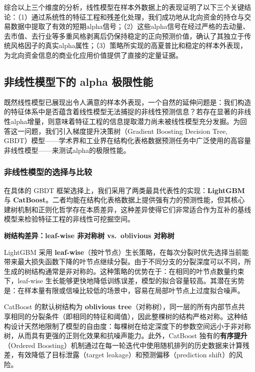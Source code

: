 \documentclass{article}
\begin{document}
综合以上三个维度的分析，线性模型在样本外数据上的表现证明了以下三个关键结论：（1）通过系统性的特征工程和残差化处理，我们成功地从北向资金的持仓与交易数据中提取了有效的短期alpha信号；（2）这些alpha信号在经过严格的去动量、去市值、去行业等多重风格剥离后仍保持稳定的正向预测价值，确认了其独立于传统风格因子的真实alpha属性；（3）策略所实现的高夏普比和稳定的样本外表现，为北向资金信息的商业化应用价值提供了直接的定量证据。

\subsection{非线性模型下的 alpha 极限性能}
\label{sec:nonlinear}

既然线性模型已展现出令人满意的样本外表现，一个自然的延伸问题是：我们构造的特征体系中是否蕴含着线性模型无法捕捉的非线性预测信息？若存在显著的非线性alpha增量，则意味着特征工程的信息提取潜力尚未被线性模型充分发掘。为回答这一问题，我们引入梯度提升决策树（Gradient Boosting Decision Tree, GBDT）模型——学术界和工业界在结构化表格数据预测任务中广泛使用的高容量非线性模型——来测试alpha的极限性能。

\subsubsection{非线性模型的选择与比较}

在具体的 GBDT 框架选择上，我们采用了两类最具代表性的实现：\textbf{LightGBM} 与 \textbf{CatBoost}。二者均能在结构化表格数据上提供强有力的预测性能，但其核心建树机制和正则化哲学存在本质差异，这种差异使得它们非常适合作为互补的基线模型来检验特征工程的非线性可挖掘空间。

\vspace{0.3em}
\noindent\textbf{树结构差异：leaf-wise 非对称树 vs.\ oblivious 对称树}

LightGBM 采用 \textbf{leaf-wise}（按叶节点）生长策略，在每次分裂时优先选择当前能带来最大损失函数下降的叶节点继续分裂。由于不同分支的分裂深度可以不同，所生成的树结构通常是非对称的。这种策略的优势在于：在相同的叶节点数量约束下，leaf-wise 生长能够更快地降低训练误差，模型的拟合容量较高。其潜在劣势是：在样本量有限或信噪比较低的场景中，容易在局部叶节点上过度拟合噪声。

CatBoost 的默认树结构为 \textbf{oblivious tree}（对称树），同一层的所有内部节点共享相同的分裂条件（即相同的特征和阈值），因此整棵树的结构严格对称。这种结构设计天然地限制了模型的自由度：每棵树在给定深度下的参数空间远小于非对称树，从而具有更强的正则化效果和抗噪声能力。此外，CatBoost 独有的\textbf{有序提升}（Ordered Boosting）机制通过在每一轮迭代中使用随机排列的历史数据来计算残差，有效降低了目标泄露（target leakage）和预测偏移（prediction shift）的风险。
\end{document}
